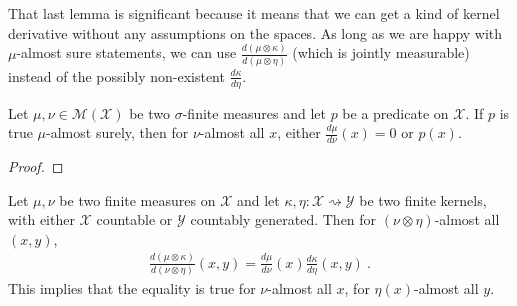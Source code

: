 That last lemma is significant because it means that we can get a kind of kernel derivative without any assumptions on the spaces.
As long as we are happy with $\mu$-almost sure statements, we can use $\frac{d (\mu \otimes \kappa)}{d (\mu \otimes \eta)}$ (which is jointly measurable) instead of the possibly non-existent $\frac{d \kappa}{d \eta}$.


\begin{lemma}
  \label{lem:ae_rnDeriv_ne_zero}
  \mathlibok
  \uses{}
  Let $\mu, \nu \in \mathcal M(\mathcal X)$ be two $\sigma$-finite measures and let $p$ be a predicate on $\mathcal X$.
  If $p$ is true $\mu$-almost surely, then for $\nu$-almost all $x$, either $\frac{d\mu}{d\nu}(x) = 0$ or $p(x)$.
\end{lemma}

\begin{proof}\mathlibok
\uses{}

\end{proof}


\begin{lemma}
  \label{lem:rnDeriv_compProd}
  \mathlibok
  Let $\mu, \nu$ be two finite measures on $\mathcal X$ and let $\kappa, \eta : \mathcal X \rightsquigarrow \mathcal Y$ be two finite kernels, with either $\mathcal X$ countable or $\mathcal{Y}$ countably generated.
  Then for $(\nu \otimes \eta)$-almost all $(x, y)$,
  \begin{align*}
  \frac{d (\mu \otimes \kappa)}{d (\nu \otimes \eta)}(x,y) = \frac{d\mu}{d\nu}(x)\frac{d \kappa}{d \eta}(x,y)
  \: .
  \end{align*}
  This implies that the equality is true for $\nu$-almost all $x$, for $\eta(x)$-almost all $y$.
\end{lemma}

